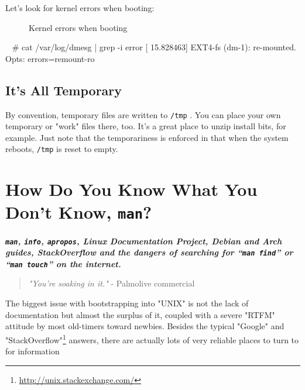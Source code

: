 \documentclass[10pt,american,]{book}
\newenvironment{Shaded}{\begin{snugshade}}{\end{snugshade}}
\newcommand{\KeywordTok}[1]{\textcolor[rgb]{0.13,0.29,0.53}{\textbf{{#1}}}}
\newcommand{\CommentTok}[1]{\textcolor[rgb]{0.56,0.35,0.01}{\textit{{#1}}}}
\newcommand{\NormalTok}[1]{{#1}}
\renewcommand{\href}[2]{#2\footnote{\url{#1}}}
\numberwithin{figure}{chapter}
\DeclareRobustCommand{\drcap}[1]{\begin{figure}[H]\caption{#1}\end{figure}}
\renewcommand{\KeywordTok}[1]{{#1}}
\renewcommand{\CommentTok}[1]{{#1}}
\renewcommand{\NormalTok}[1]{{#1}}
\begin{document}
Let's look for kernel errors when booting:

\drcap{Kernel errors when booting}

\begin{Shaded}
\begin{Highlighting}[]
\KeywordTok{~} \CommentTok{# cat /var/log/dmesg | grep -i error}
\KeywordTok{[}   \NormalTok{15.828463] EXT4-fs (dm-1): re-mounted. Opts: errors=remount-ro}
\end{Highlighting}
\end{Shaded}

\section*{It's All Temporary}\label{its-all-temporary}

By convention, temporary files are written to \texttt{/tmp}
. You can place
your own temporary or "work" files there, too. It's a great place to
unzip install bits, for example. Just note that the temporariness is
enforced in that when the system reboots, \texttt{/tmp} is reset to
empty.

\hypertarget{how-do-you-know-what-you-dont-know-man}{\chapter{\texorpdfstring{How
Do You Know What You Don’t Know,
\texttt{man}?}{How Do You Know What You Don’t Know, man?}}\label{how-do-you-know-what-you-dont-know-man}}

\textbf{\emph{\texttt{man}, \texttt{info}, \texttt{apropos}, Linux
Documentation Project, Debian and Arch guides, StackOverflow and the
dangers of searching for “\texttt{man\ find}” or “\texttt{man\ touch}”
on the internet.}}

\begin{quote}
\emph{"You're soaking in it."} - Palmolive commercial
\end{quote}

The biggest issue with bootstrapping into "UNIX" is not the lack of
documentation but almost the surplus of it, coupled with a severe "RTFM"
attitude by most old-timers toward newbies. Besides the typical "Google"
and \href{http://unix.stackexchange.com/}{"StackOverflow"}
answers, there are actually lots of very reliable places to turn to for
information
\end{document}
